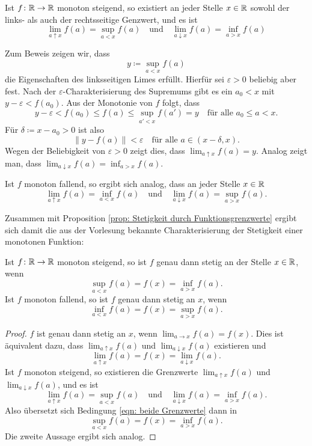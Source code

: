 \documentclass[a4paper,10pt]{article}
\begin{document}
\begin{bsp}
 Ist $f \colon \mathbb{R} \to \mathbb{R}$ monoton steigend, so existiert an jeder Stelle $x \in \mathbb{R}$ sowohl der links- als auch der rechtsseitige Genzwert, und es ist
 \[
  \lim_{a \uparrow x} f(a) = \sup_{a < x} f(a)
  \quad
  \text{und}
  \quad
  \lim_{a \downarrow x} f(a) = \inf_{a > x} f(a)
 \]

 Zum Beweis zeigen wir, dass
 \[
  y \coloneqq \sup_{a < x} f(a)
 \]
 die Eigenschaften des linksseitigen Limes erfüllt. Hierfür sei $\varepsilon > 0$ beliebig aber fest. Nach der $\varepsilon$-Charakterisierung des Supremums gibt es ein $a_0 < x$ mit $y-\varepsilon < f(a_0)$. Aus der Monotonie von $f$ folgt, dass
 \[
  y-\varepsilon < f(a_0) \leq f(a) \leq \sup_{a' < x} f(a') = y \quad \text{für alle $a_0 \leq a < x$}.
 \]
 Für $\delta \coloneqq x-a_0 > 0$ ist also
 \[
  \|y - f(a)\| < \varepsilon \quad \text{für alle $a \in (x-\delta, x)$}.
 \]
 Wegen der Beliebigkeit von $\varepsilon > 0$ zeigt dies, dass $\lim_{a \uparrow x} f(a) = y$. Analog zeigt man, dass $\lim_{a \downarrow x} f(a) = \inf_{a > x} f(a)$.
 
 Ist $f$ monoton fallend, so ergibt sich analog, dass an jeder Stelle $x \in \mathbb{R}$
  \[
  \lim_{a \uparrow x} f(a) = \inf_{a < x} f(a)
  \quad
  \text{und}
  \quad
  \lim_{a \downarrow x} f(a) = \sup_{a > x} f(a).
 \]
\end{bsp}


Zusammen mit Proposition \ref{prop: Stetigkeit durch Funktionsgrenzwerte} ergibt sich damit die aus der Vorlesung bekannte Charakterisierung der Stetigkeit einer monotonen Funktion:


\begin{kor}
 Ist $f \colon \mathbb{R} \to \mathbb{R}$ monoton steigend, so ist $f$ genau dann stetig an der Stelle $x \in \mathbb{R}$, wenn
 \[
  \sup_{a < x} f(a) = f(x) = \inf_{a > x} f(a).
 \]
 Ist $f$ monoton fallend, so ist $f$ genau dann stetig an $x$, wenn
 \[
  \inf_{a < x} f(a) = f(x) = \sup_{a > x} f(a).
 \]
\end{kor}
\begin{proof}
 $f$ ist genau dann stetig an $x$, wenn $\lim_{a \to x} f(a) = f(x)$. Dies ist äquivalent dazu, dass $\lim_{a \uparrow x} f(a)$ und $\lim_{a \downarrow x} f(a)$ existieren und
 \begin{equation}\label{eqn: beide Grenzwerte}
  \lim_{a \uparrow x} f(a) = f(x) = \lim_{a \downarrow x} f(a).
 \end{equation}
 Ist $f$ monoton steigend, so existieren die Grenzwerte $\lim_{a \uparrow x} f(a)$ und $\lim_{a \downarrow x} f(a)$, und es ist
 \[
  \lim_{a \uparrow x} f(a) = \sup_{a < x} f(a)
  \quad
  \text{und}
  \quad
  \lim_{a \downarrow x} f(a) = \inf_{a > x} f(a).
 \]
 Also übersetzt sich Bedingung \eqref{eqn: beide Grenzwerte} dann in
 \[
  \sup_{a < x} f(a) = f(x) = \inf_{a > x} f(a).
 \]
 Die zweite Aussage ergibt sich analog.
\end{proof}
\end{document}
